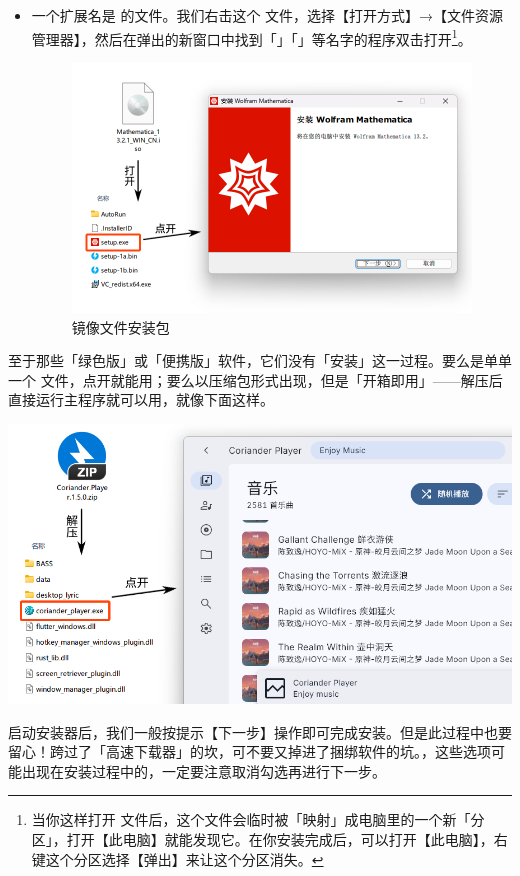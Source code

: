 \begin{itemize}
  \item 一个扩展名是  的文件。我们右击这个  文件，选择【打开方式】→【文件资源管理器】，然后在弹出的新窗口中找到「」「」等名字的程序双击打开\footnote{当你这样打开  文件后，这个文件会临时被「映射」成电脑里的一个新「分区」，打开【此电脑】就能发现它。在你安装完成后，可以打开【此电脑】，右键这个分区选择【弹出】来让这个分区消失。}。
    \begin{figure}[htb!]
      \centering
      \includegraphics[width=.6\textwidth]{assets/basic/Image_Installer.png}
      \caption{镜像文件安装包}
      \label{fig:Image_Installer}
    \end{figure}
\end{itemize}

\begin{note}
  至于那些「绿色版」或「便携版」软件，它们没有「安装」这一过程。要么是单单一个  文件，点开就能用；要么以压缩包形式出现，但是「开箱即用」——解压后直接运行主程序就可以用，就像下面这样。
  \begin{center}
    \includegraphics[width=.7\textwidth]{assets/basic/Portable_app.png}
    \label{fig:Portable_app}
  \end{center}
\end{note}

启动安装器后，我们一般按提示【下一步】操作即可完成安装。但是此过程中也要留心！跨过了「高速下载器」的坎，可不要又掉进了捆绑软件的坑。，这些选项可能出现在安装过程中的，一定要注意取消勾选再进行下一步。

